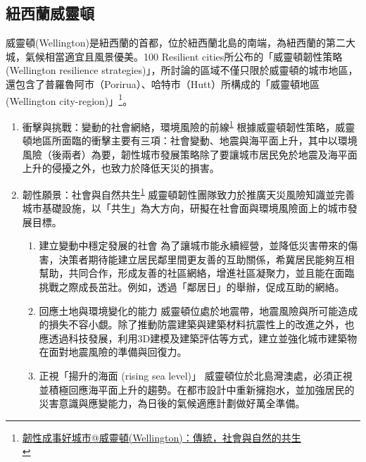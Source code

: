 \documentclass[a4paper,12pt]{article}
\begin{document}
\subsection{紐西蘭威靈頓}
\label{sec:orgda0850c}
威靈頓(Wellington)是紐西蘭的首都，位於紐西蘭北島的南端，為紐西蘭的第二大城，氣候相當適宜且風景優美。100 Resilient cities所公布的「威靈頓韌性策略(Wellington resilience strategies)」，所討論的區域不僅只限於威靈頓的城市地區，還包含了普羅魯阿市（Porirua）、哈特市（Hutt）所構成的「威靈頓地區(Wellington city-region)」\footnote{\href{https://eyesonplace.net/2018/12/19/9738/}{韌性成事好城市@威靈頓(Wellington)：傳統，社會與自然的共生}\\\label{orgf4d079e}}。\\
\begin{enumerate}
\item 衝擊與挑戰：變動的社會網絡，環境風險的前線\textsuperscript{\ref{orgf4d079e}}
\label{sec:orgaa4ec2d}
根據威靈頓韌性策略，威靈頓地區所面臨的衝擊主要有三項：社會變動、地震與海平面上升，其中以環境風險（後兩者）為要，韌性城市發展策略除了要讓城市居民免於地震及海平面上升的侵擾之外，也致力於降低天災的損害。\\

\item 韌性願景：社會與自然共生\textsuperscript{\ref{orgf4d079e}}
\label{sec:org4494c57}
威靈頓韌性團隊致力於推廣天災風險知識並完善城市基礎設施，以「共生」為大方向，研擬在社會面與環境風險面上的城市發展目標。\\
\begin{enumerate}
\item 建立變動中穩定發展的社會   為了讓城市能永續經營，並降低災害帶來的傷害，決策者期待能建立居民鄰里間更友善的互助關係，希冀居民能夠互相幫助，共同合作，形成友善的社區網絡，增進社區凝聚力，並且能在面臨挑戰之際成長茁壯。例如，透過「鄰居日」的舉辦，促成互助的網絡。\\
\item 回應土地與環境變化的能力   威靈頓位處於地震帶，地震風險與所可能造成的損失不容小覷。除了推動防震建築與建築材料抗震性上的改進之外，也應透過科技發展，利用3D建模及建築評估等方式，建立並強化城市建築物在面對地震風險的準備與回復力。\\
\item 正視「揚升的海面 (rising sea level)」   威靈頓位於北島灣澳處，必須正視並積極回應海平面上升的趨勢。在都市設計中重新擁抱水，並加強居民的災害意識與應變能力，為日後的氣候適應計劃做好萬全準備。\\
\end{enumerate}


\end{enumerate}
\end{document}
